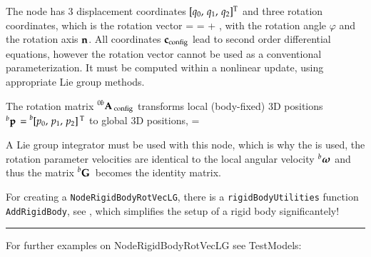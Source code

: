     The node has 3 displacement coordinates $[q_0,\,q_1,\,q_2]^\mathrm{T}$ and three rotation coordinates, which is the rotation vector 
    \be
      \tnu = \varphi \nv = \tnu\cConfig + \tnu\cRef,
    \ee
    with the rotation angle $\varphi$ and the rotation axis $\mathbf{n}$.
    All coordinates $\mathbf{c}_\mathrm{config}$ lead to second order differential equations, however the rotation vector cannot be used as a conventional parameterization. It must be computed within a nonlinear update, using appropriate Lie group methods.

    The rotation matrix $\prescript{0b}{}{\mathbf{A}}\,_\mathrm{config}$ transforms local (body-fixed) 3D positions $\prescript{b}{}{\mathbf{p}}\, = \prescript{b}{}{[p_0,\,p_1,\,p_2]}\,^\mathrm{T}$ to global 3D positions,
    \be
      \cConfig = \cConfig {} 
    \ee
    
    A Lie group integrator must be used with this node, which is why the is used, the 
    rotation parameter velocities are identical to the local angular velocity $\prescript{b}{}{\mbox{\boldmath $\omega$ \unboldmath}\!\!}\,$ and thus the 
    matrix $ \prescript{b}{}{\mathbf{G}}\,$ becomes the identity matrix.
    
    For creating a \texttt{NodeRigidBodyRotVecLG}, there is a \texttt{rigidBodyUtilities} function \texttt{AddRigidBody}, 
    see , which simplifies the setup of a rigid body significantely!
\vspace{6pt}\par\noindent\rule{\textwidth}{0.4pt}
%
\noindent For further examples on NodeRigidBodyRotVecLG see TestModels:
\bi
\item{}\item{}\item{}\ei

